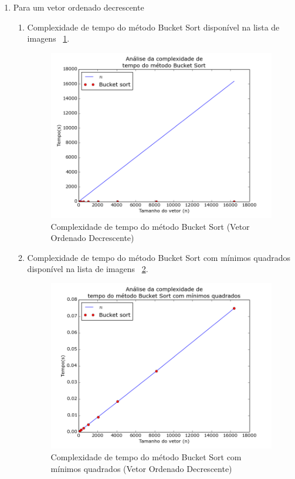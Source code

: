 \documentclass[12pt,a4paper,twoside]{report}
\begin{document}
\begin{enumerate}
\begin{enumerate}
		\end{enumerate}



		\item Para um vetor ordenado decrescente
				\begin{enumerate}

					\item Complexidade de tempo do método Bucket Sort disponível na lista de imagens ~\ref{fig:BucketPlot2OD}.
					\begin{figure}[!h]
						\centering
						\includegraphics[scale=0.6]{../imagens/Bucket/Bucket_plot_2_ordenado_decrescente.png}
						\caption{Complexidade de tempo do método Bucket Sort (Vetor Ordenado Decrescente) \label{fig:BucketPlot2OD}}
					\end{figure}


					\item Complexidade de tempo do método Bucket Sort com mínimos quadrados disponível na lista de imagens  ~\ref{fig:BucketPlot3OD}.
					\begin{figure}[!h]
						\centering
						\includegraphics[scale=0.6]{../imagens/Bucket/Bucket_plot_3_ordenado_decrescente.png}
						\caption{Complexidade de tempo do método Bucket Sort com mínimos quadrados (Vetor Ordenado Decrescente) \label{fig:BucketPlot3OD}}
					\end{figure}


\end{enumerate}
\end{enumerate}
\end{document}
